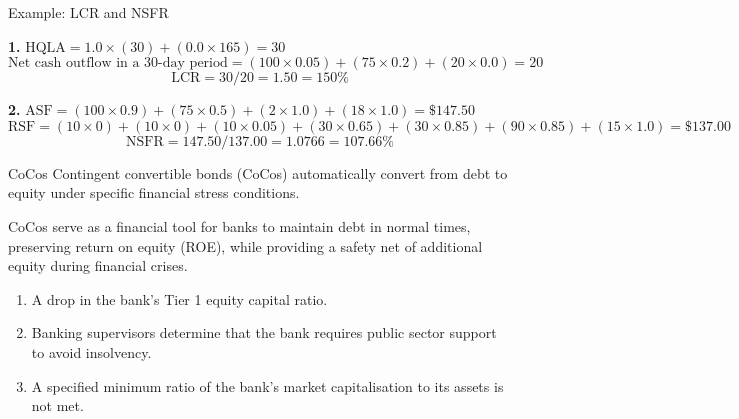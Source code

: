 \begin{orexambox}{Example: LCR and NSFR}
\vspace{7pt}
\par
\vspace{3pt}
\textbf{1.} $\mathrm{HQLA}=1.0\times(30)+(0.0\times165)=30$
\[
\text{Net cash outflow in a 30-day period}=(100\times0.05)+(75\times0.2)+(20\times0.0)=20
\]
\[
\mathrm{LCR}=30/20=1.50=150\%
\]

\vspace{4pt}
\textbf{2.} $\mathrm{ASF}=(100\times0.9)+(75\times0.5)+(2\times1.0)+(18\times1.0)=\$147.50$
\[
\mathrm{RSF}=(10\times0)+(10\times0)+(10\times0.05)+(30\times0.65)+(30\times0.85)+(90\times0.85)+(15\times1.0)=\$137.00
\]
\[
\mathrm{NSFR}=147.50/137.00=1.0766=107.66\%
\]
\end{orexambox}



\begin{ordefbox}{CoCos}
Contingent convertible bonds (CoCos) automatically convert from debt to equity
under specific financial stress conditions.
\end{ordefbox}

CoCos serve as a financial tool for banks to maintain debt in normal times,
preserving return on equity (ROE), while providing a safety net of additional
equity during financial crises.


\begin{enumerate}
\item[\textcolor{rust}{\sffamily\bfseries 1.}] A drop in the bank's Tier 1 equity
capital ratio.
\item[\textcolor{rust}{\sffamily\bfseries 2.}] Banking supervisors determine that
the bank requires public sector support to avoid insolvency.
\item[\textcolor{rust}{\sffamily\bfseries 3.}] A specified minimum ratio of the
bank's market capitalisation to its assets is not met.
\end{enumerate}


